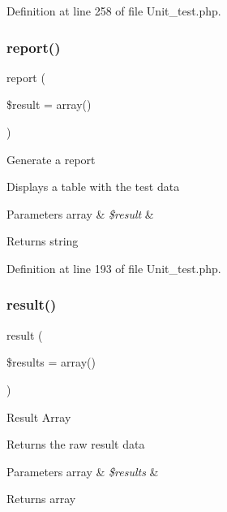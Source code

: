 Definition at line 258 of file Unit\+\_\+test.\+php.

\mbox{\label{class_c_i___unit__test_a339c46eabb709c1c492bc264c9634171}} 
\subsubsection{\texorpdfstring{report()}{report()}}
{\footnotesize\ttfamily report (\begin{DoxyParamCaption}\item[{}]{\$result = {\ttfamily array()} }\end{DoxyParamCaption})}

Generate a report

Displays a table with the test data


\begin{DoxyParams}[1]{Parameters}
array & {\em \$result} & \\
\hline
\end{DoxyParams}
\begin{DoxyReturn}{Returns}
string 
\end{DoxyReturn}


Definition at line 193 of file Unit\+\_\+test.\+php.

\mbox{\label{class_c_i___unit__test_adcfdd404b2f2610e0690b4beb7786ce5}} 
\subsubsection{\texorpdfstring{result()}{result()}}
{\footnotesize\ttfamily result (\begin{DoxyParamCaption}\item[{}]{\$results = {\ttfamily array()} }\end{DoxyParamCaption})}

Result Array

Returns the raw result data


\begin{DoxyParams}[1]{Parameters}
array & {\em \$results} & \\
\hline
\end{DoxyParams}
\begin{DoxyReturn}{Returns}
array 
\end{DoxyReturn}


